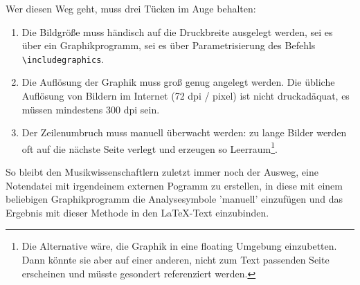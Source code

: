 Wer diesen Weg geht, muss drei Tücken im Auge behalten:
\begin{enumerate}
  \item Die Bildgröße muss händisch auf die Druckbreite ausgelegt werden, sei es über
  ein Graphikprogramm, sei es über Parametrisierung des Befehls
  \texttt{\textbackslash{includegraphics}}.
  \item Die Auflösung der Graphik muss groß genug angelegt werden. Die übliche
  Auflösung von Bildern im Internet (72 dpi / pixel) ist nicht druckadäquat, es
  müssen mindestens 300 dpi sein.
  \item Der Zeilenumbruch muss manuell überwacht werden: zu lange Bilder werden
  oft auf die nächste Seite verlegt und erzeugen so Leerraum\footnote{Die
  Alternative wäre, die Graphik in eine floating Umgebung einzubetten. Dann
  könnte sie aber auf einer anderen, nicht zum Text passenden Seite erscheinen
  und müsste gesondert referenziert werden.}.
\end{enumerate}



So bleibt den Musikwissenschaftlern zuletzt immer noch der Ausweg, eine
Notendatei mit irgendeinem externen Pogramm zu erstellen, in diese mit einem
beliebigen Graphikprogramm die Analysesymbole 'manuell' einzufügen und das
Ergebnis mit dieser Methode in den \LaTeX-Text einzubinden.

% 
